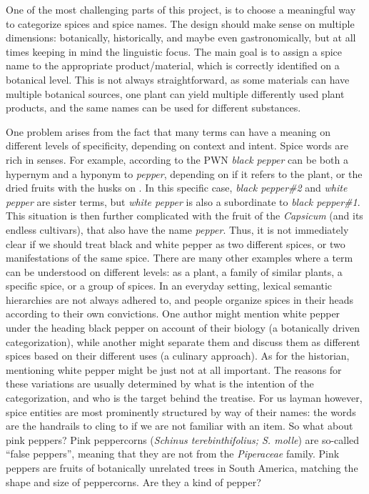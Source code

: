 One of the most challenging parts of this project, is to choose a meaningful way to categorize spices and spice names. The design should make sense on multiple dimensions: botanically, historically, and maybe even gastronomically, but at all times keeping in mind the linguistic focus. The main goal is to assign a spice name to the appropriate product/material, which is correctly identified on a botanical level. This is not always straightforward, as some materials can have multiple botanical sources, one plant can yield multiple differently used plant products, and the same names can be used for different substances. 

One problem arises from the fact that many terms can have a meaning on different levels of specificity, depending on context and intent. Spice words are rich in senses. For example, according to the \gls{PWN} \textit{black pepper} can be both a hypernym and a hyponym to \textit{pepper}, depending on if it refers to the plant, or the dried fruits with the husks on \autocite{fellbaum_wordnet_1998}. In this specific case, \textit{black pepper\#2} and \textit{white pepper} are sister terms, but \textit{white pepper} is also a subordinate to \textit{black pepper\#1}. This situation is then further complicated with the fruit of the \textit{Capsicum} (and its endless cultivars), that also have the name \textit{pepper}. Thus, it is not immediately clear if we should treat black and white pepper as two different spices, or two manifestations of the same spice. There are many other examples where a term can be understood on different levels: as a plant, a family of similar plants, a specific spice, or a group of spices. In an everyday setting, lexical semantic hierarchies are not always adhered to, and people organize spices in their heads according to their own convictions. One author might mention white pepper under the heading black pepper on account of their biology (a botanically driven categorization), while another might separate them and discuss them as different spices based on their different uses (a culinary approach). As for the historian, mentioning white pepper might be just not at all important. The reasons for these variations are usually determined by what is the intention of the categorization, and who is the target behind the treatise. For us layman however, spice entities are most prominently structured by way of their names: the words are the handrails to cling to if we are not familiar with an item. So what about pink peppers? Pink peppercorns (\textit{Schinus terebinthifolius; S. molle}) are so-called ``false peppers'', meaning that they are not from the \textit{Piperaceae} family. Pink peppers are fruits of botanically unrelated trees in South America, matching the shape and size of peppercorns. Are they a kind of pepper?


